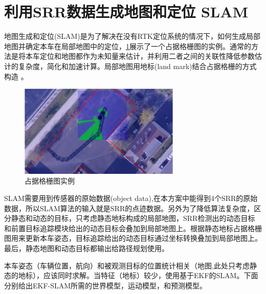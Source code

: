 \documentclass[12pt,a4paper]{article}
\newcommand{\zhiv}{\fontsize{12pt}{18pt}\selectfont}      %
\begin{document}
\section{\textbf{\zhiv 利用SRR数据生成地图和定位 SLAM}}
地图生成和定位(SLAM)是为了解决在没有RTK定位系统的情况下，如何生成局部地图并确定本车在局部地图中的定位，\ref{f_ogm_ex}展示了一个占据格栅图的实例。通常的方法是将本车定位和地图都作为未知量来估计，并利用二者之间的关联性降低参数估计的复杂度，简化和加速计算。局部地图用地标(land mark)结合占据格栅的方式构造 \parencite{Thrun:2005:PR:1121596}。
\begin{figure}[!htb]
	\centering
	\includegraphics[height=125pt]{ogm_ex.jpg}
	\caption{占据格栅图实例\label{f_ogm_ex}}
\end{figure}

SLAM需要用到传感器的原始数据(object data),在本方案中能得到4个SRR的原始数据，所以SLAM算法的输入就是SRR的点迹数据。另外为了降低算法复杂度，区分静态和动态的目标，只考虑静态地标构成的局部地图，SRR检测出的动态目标和前置目标追踪模块给出的动态目标会叠加到局部地图上。根据静态地标占据格栅图用来更新本车姿态，目标追踪给出的动态目标通过坐标转换叠加到局部地图上。最后，静态地图和动态目标都输出给路径规划使用。

本车姿态（车辆位置，航向）和被观测目标的位置统计相关（地图,此处只考虑静态的地标），应该同时求解。当特征（地标）较少，使用基于EKF的SLAM\parencite{Castellanos2005MapBA,KF_OGM}。下面分别给出EKF-SLAM所需的世界模型，运动模型，和预测模型。
\end{document}
